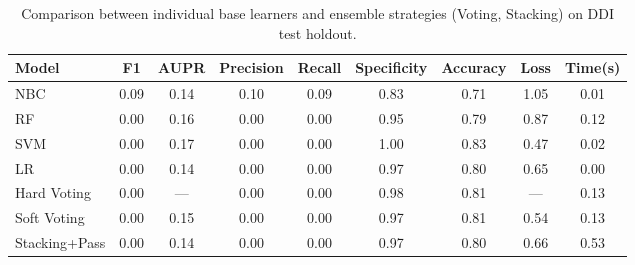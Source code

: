 \begin{table}[htbp]
\centering
\caption{Comparison between individual base learners and ensemble strategies (Voting, Stacking) on DDI test holdout.}
\label{tab:ensemble_results}
\begin{tabular}{lcccccccc}
\toprule
Model & F1 & AUPR & Precision & Recall & Specificity & Accuracy & Loss & Time(s) \\
\midrule
[Base] NBC & 0.09 & 0.14 & 0.10 & 0.09 & 0.83 & 0.71 & 1.05 & 0.01 \\
[Base] RF & 0.00 & 0.16 & 0.00 & 0.00 & 0.95 & 0.79 & 0.87 & 0.12 \\
[Base] SVM & 0.00 & 0.17 & 0.00 & 0.00 & 1.00 & 0.83 & 0.47 & 0.02 \\
[Base] LR & 0.00 & 0.14 & 0.00 & 0.00 & 0.97 & 0.80 & 0.65 & 0.00 \\
Hard Voting & 0.00 & — & 0.00 & 0.00 & 0.98 & 0.81 & — & 0.13 \\
Soft Voting & 0.00 & 0.15 & 0.00 & 0.00 & 0.97 & 0.81 & 0.54 & 0.13 \\
Stacking+Pass & 0.00 & 0.14 & 0.00 & 0.00 & 0.97 & 0.80 & 0.66 & 0.53 \\
\bottomrule
\end{tabular}
\end{table}